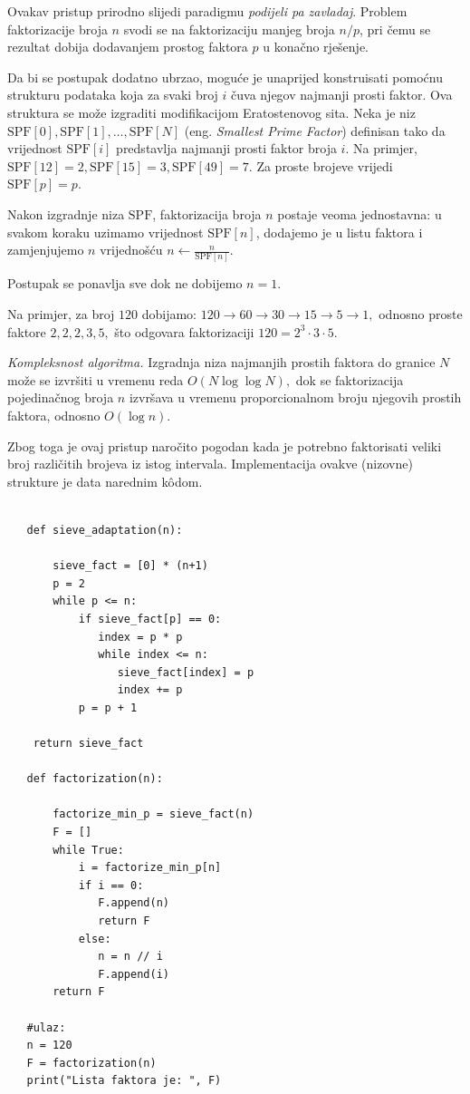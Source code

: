 \medskip

Ovakav pristup prirodno slijedi paradigmu \textit{podijeli pa zavladaj}. Problem faktorizacije broja $n$ svodi se na faktorizaciju manjeg broja $n/p$, pri čemu se rezultat dobija dodavanjem prostog faktora $p$ u konačno rješenje.

\medskip

Da bi se postupak dodatno ubrzao, moguće je unaprijed konstruisati pomoćnu strukturu podataka koja za svaki broj $i$ čuva njegov najmanji prosti faktor. Ova struktura se može izgraditi modifikacijom Eratostenovog sita. Neka je niz $
\textrm{SPF}[0], \textrm{SPF}[1], \ldots, \textrm{SPF}[N]$ (eng. \emph{Smallest Prime Factor}) definisan tako da vrijednost $\textrm{SPF}[i]$ predstavlja najmanji prosti faktor broja $i$. Na primjer, $
\textrm{SPF}[12]=2,
\textrm{SPF}[15]=3,
\textrm{SPF}[49]=7.$ Za proste brojeve vrijedi $ \textrm{SPF}[p]=p. $

Nakon izgradnje niza $\textrm{SPF}$, faktorizacija broja $n$ postaje veoma jednostavna: u svakom koraku uzimamo vrijednost $\textrm{SPF}[n]$, dodajemo je u listu faktora i zamjenjujemo $n$ vrijednošću $n \leftarrow \frac{n}{\textrm{SPF}[n]}.$

Postupak se ponavlja sve dok ne dobijemo $n=1$.

\medskip

Na primjer, za broj $120$ dobijamo: $
120 \rightarrow 60 \rightarrow 30 \rightarrow 15 \rightarrow 5 \rightarrow 1,$ odnosno proste faktore $2,2,2,3,5,$ što odgovara faktorizaciji $
120 = 2^3 \cdot 3 \cdot 5.$

\medskip

\textit{Kompleksnost algoritma.} Izgradnja niza najmanjih prostih faktora do granice $N$ može se izvršiti u vremenu reda $O(N \log \log N),$  dok se faktorizacija pojedinačnog broja $n$ izvršava u vremenu proporcionalnom broju njegovih prostih faktora, odnosno $O(\log n).$

Zbog toga je ovaj pristup naročito pogodan kada je potrebno faktorisati veliki broj različitih brojeva iz istog intervala. Implementacija ovakve (nizovne) strukture je data narednim k\^odom. 
 
 \begin{verbatim}
 
   def sieve_adaptation(n):
   
       sieve_fact = [0] * (n+1)
       p = 2
       while p <= n:
           if sieve_fact[p] == 0:
       		  index = p * p
       		  while index <= n:
       			 sieve_fact[index] = p
       			 index += p
           p = p + 1
 	
	return sieve_fact
 	
   def factorization(n):
       
       factorize_min_p = sieve_fact(n)
       F = []
       while True: 
           i = factorize_min_p[n]
           if i == 0: 
              F.append(n)
              return F
           else:
              n = n // i
              F.append(i)
       return F  
   
   #ulaz: 
   n = 120
   F = factorization(n)
   print("Lista faktora je: ", F)
 \end{verbatim} 
 
